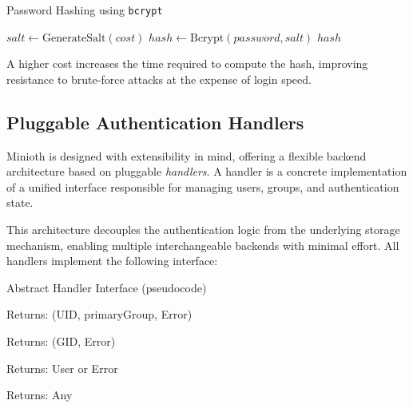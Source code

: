 \begin{algorithm}
\caption{Password Hashing using \texttt{bcrypt}}\label{alg:bcrypt}
\begin{algorithmic}[1]
    \State $salt \gets \text{GenerateSalt}(cost)$
    \State $hash \gets \text{Bcrypt}(password, salt)$
    \State \Return $hash$
\EndProcedure
\end{algorithmic}
\end{algorithm}


A higher cost increases the time required to compute the hash, improving resistance to brute-force attacks at the expense of login speed.

\subsection{Pluggable Authentication Handlers}

Minioth is designed with extensibility in mind, offering a flexible backend architecture based on pluggable \textit{handlers}. A handler is a concrete implementation of a unified interface responsible for managing users, groups, and authentication state.

This architecture decouples the authentication logic from the underlying storage mechanism, enabling multiple interchangeable backends with minimal effort. All handlers implement the following interface:

\begin{algorithm}[H]
\caption{Abstract Handler Interface (pseudocode)}
\begin{algorithmic}
\EndFunction

  \State Returns: (UID, primaryGroup, Error)
\EndFunction

\EndFunction

\EndFunction

\EndFunction

  \State Returns: (GID, Error)
\EndFunction

\EndFunction

\EndFunction

\EndFunction

  \State Returns: User or Error
\EndFunction

  \State Returns: Any
\EndFunction

\EndFunction

\EndFunction
\end{algorithmic}
\end{algorithm}



